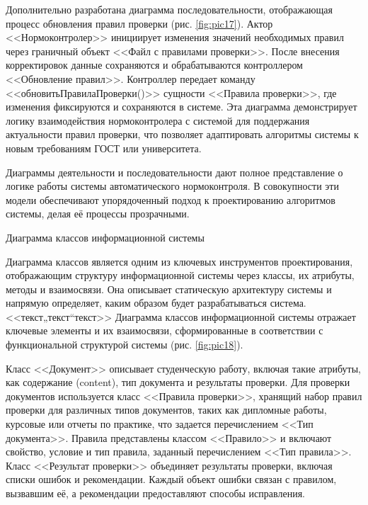 \documentclass{report}
\begin{document}
Дополнительно разработана диаграмма последовательности, отображающая процесс обновления правил проверки (рис.  \ref{fig:pic17}). Актор <<Нормоконтролер>> инициирует изменения значений необходимых правил через граничный объект <<Файл с правилами проверки>>. После внесения корректировок данные сохраняются и обрабатываются контроллером <<Обновление правил>>. Контроллер передает команду <<обновитьПравилаПроверки()>> сущности <<Правила проверки>>, где изменения фиксируются и сохраняются в системе. Эта диаграмма демонстрирует логику взаимодействия нормоконтролера с системой для поддержания актуальности правил проверки, что позволяет адаптировать алгоритмы системы к новым требованиям ГОСТ или университета.


Диаграммы деятельности и последовательности дают полное представление о логике работы системы автоматического нормоконтроля. В совокупности эти модели обеспечивают упорядоченный подход к проектированию алгоритмов системы, делая её процессы прозрачными.

Диаграмма классов информационной системы

Диаграмма классов является одним из ключевых инструментов проектирования, отображающим структуру информационной системы через классы, их атрибуты, методы и взаимосвязи. Она описывает статическую архитектуру системы %
и напрямую определяет, каким образом будет разрабатываться система. <<текст„текст“текст>>
Диаграмма классов информационной системы отражает ключевые элементы и их взаимосвязи, сформированные в соответствии с функциональной структурой системы (рис. \ref{fig:pic18}). 

Класс <<Документ>> описывает студенческую работу, включая такие атрибуты, как содержание (content), тип документа и результаты проверки. Для проверки документов используется класс <<Правила проверки>>, хранящий набор правил проверки для различных типов документов, таких как дипломные работы, курсовые или отчеты по практике, что задается перечислением <<Тип документа>>. Правила представлены классом <<Правило>> и включают свойство, условие и тип правила, заданный перечислением <<Тип правила>>. Класс <<Результат проверки>> объединяет результаты проверки, включая списки ошибок и рекомендации. Каждый объект ошибки связан с правилом, вызвавшим её, а рекомендации предоставляют способы исправления.
\end{document}
